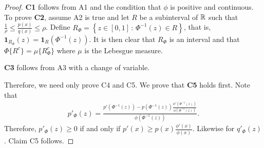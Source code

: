 \documentclass{article}
\begin{document}
\begin{proof}

\textbf{C1} follows from A1 and the condition that $\phi$ is positive and continuous. \\

To prove \textbf{C2}, assume A2 is true and let $R$ be a subinterval of ${\mathbb R}$ such that $\frac{1}{\rho} \leq \frac{p(x)}{q(x)} \leq \rho$. Define $R_{\Phi} = \left\{ z \in [0,1] \,:\, \Phi^{-1}(z) \in R \right\}$, that is, $\mathbf{1}_{R_\Phi}(z) = \mathbf{1}_R(\Phi^{-1}(z))$. It is then clear that $R_{\Phi}$ is an interval and that $\Phi\{ R^c \} = \mu\{ R_{\Phi}^c \}$ where $\mu$ is the Lebesgue measure. 

 
\textbf{C3} follows from A3 with a change of variable. 


Therefore, we need only prove C4 and C5. We prove that \textbf{C5} holds first. Note that 
\begin{align*}
p'_\Phi(z) = \frac{ p'(\Phi^{-1}(z))  - 
                     p(\Phi^{-1}(z)) \frac{\phi'(\Phi^{-1}(z))}{\phi(\Phi^{-1}(z))} }
           { \phi(\Phi^{-1}(z))}.
\end{align*}
Therefore, $p'_\Phi(z) \geq 0$ if and only if $p'(x) \geq p(x) \frac{\phi'(x)}{\phi(x)}$. Likewise for $q'_\Phi(z)$. Claim C5 follows. 



\end{proof}
\end{document}
